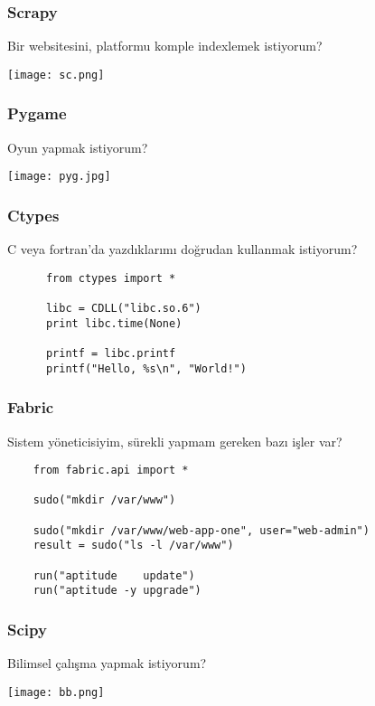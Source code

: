 \documentclass[10pt, compress]{beamer}
\begin{document}
\begin{frame}[fragile]
    \frametitle{Scrapy}
    \begin{center}
        Bir websitesini, platformu komple indexlemek istiyorum?
    \end{center}  
      \texttt{[image: sc.png]}
\end{frame}

\begin{frame}[fragile]
    \frametitle{Pygame}
    \begin{center}
        Oyun yapmak istiyorum?
    \end{center}  
      \texttt{[image: pyg.jpg]}
\end{frame}

\begin{frame}[fragile]
    \frametitle{Ctypes}
    \begin{center}
        C veya fortran'da yazdıklarımı doğrudan kullanmak istiyorum?
    
      \begin{verbatim}
      from ctypes import *
      
      libc = CDLL("libc.so.6")
      print libc.time(None)
      
      printf = libc.printf
      printf("Hello, %s\n", "World!")
      \end{verbatim}
      \end{center}  
\end{frame}

\begin{frame}[fragile]
    \frametitle{Fabric}
    \begin{center}
        Sistem yöneticisiyim, sürekli yapmam gereken bazı işler var?
    
        \begin{verbatim}
    from fabric.api import *
    
    sudo("mkdir /var/www")
    
    sudo("mkdir /var/www/web-app-one", user="web-admin")
    result = sudo("ls -l /var/www")
    
    run("aptitude    update")
    run("aptitude -y upgrade")
        \end{verbatim}
        
      \end{center}  
\end{frame}

\begin{frame}[fragile]
    \frametitle{Scipy}
    \begin{center}
        Bilimsel çalışma yapmak istiyorum?
    \end{center}  
      \texttt{[image: bb.png]}
\end{frame}
\end{document}
